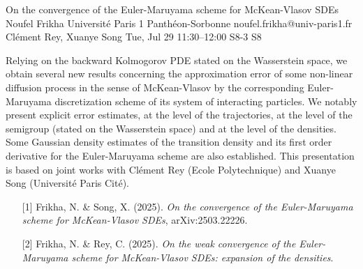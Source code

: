\begin{talk}
  {On the convergence of the Euler-Maruyama scheme for McKean-Vlasov SDEs}%
  {Noufel Frikha}%
  {Universit\'e Paris 1 Panth\'eon-Sorbonne}%
  {noufel.frikha@univ-paris1.fr}%
  {Cl\'ement Rey, Xuanye Song}%
  {}%
  {Tue, Jul 29 11:30–12:00}%
  {S8-3}%
  {S8}%
  
				
			
Relying on the backward Kolmogorov PDE stated on the Wasserstein space, we obtain several new results concerning the approximation error of some non-linear diffusion process in the sense of McKean-Vlasov by the corresponding Euler-Maruyama discretization scheme of its system of interacting particles. We notably present explicit error estimates, at the level of the trajectories, at the level of the semigroup (stated on the Wasserstein space) and at the level of the densities. Some Gaussian density estimates of the transition density and its first order derivative for the Euler-Maruyama scheme are also established. This presentation is based on joint works with Cl\'ement Rey (Ecole Polytechnique) and Xuanye Song (Universit\'e Paris Cit\'e).

\medskip


\begin{enumerate}
	\item[{[1]}] Frikha, N.  \& Song, X. (2025). {\it On the convergence of the Euler-Maruyama scheme for McKean-Vlasov SDEs}, arXiv:2503.22226.
	\item[{[2]}] Frikha, N. \& Rey, C. (2025).  {\it On the weak convergence of the Euler-Maruyama scheme for McKean-Vlasov SDEs: expansion of the densities}.
\end{enumerate}


\end{talk}

